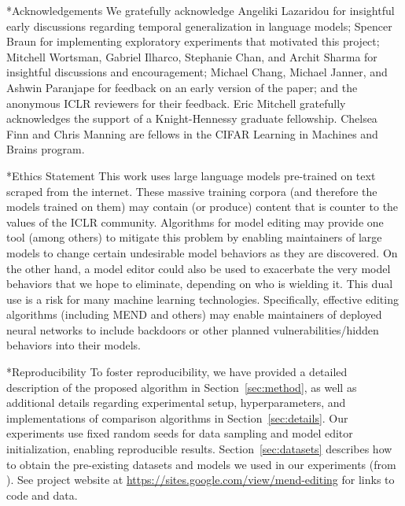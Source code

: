 \documentclass{article}
\makeatletter
\newcommand{\name}{MEND}
\newcommand{\rebuttal}[1]{#1}
\newcommand{\cameraready}[1]{#1}
\let\origsection\section
\renewcommand\section{\@ifstar{\starsection}{\nostarsection}}
\newcommand\nostarsection[1]
{\sectionprelude\origsection{#1}\sectionpostlude}
\newcommand\starsection[1]
{\sectionprelude\origsection*{#1}\sectionpostlude}
\newcommand\sectionprelude{%
  \vspace{-1.5mm}
}
\newcommand\sectionpostlude{%
  \vspace{-2mm}
}
\makeatother
\begin{document}
\cameraready{\section*{Acknowledgements}
We gratefully acknowledge Angeliki Lazaridou for insightful early discussions regarding temporal generalization in language models; Spencer Braun for implementing exploratory experiments that motivated this project; Mitchell Wortsman, Gabriel Ilharco, Stephanie Chan, and Archit Sharma for insightful discussions and encouragement; Michael Chang, Michael Janner, and Ashwin Paranjape for feedback on an early version of the paper; and the anonymous ICLR reviewers for their feedback. Eric Mitchell gratefully acknowledges the support of a Knight-Hennessy graduate fellowship. Chelsea Finn and Chris Manning are fellows in the CIFAR Learning in Machines and Brains program.}

\section*{Ethics Statement}
This work uses large language models pre-trained on text scraped from the internet. These massive training corpora (and therefore the models trained on them) may contain (or produce) content that is counter to the values of the ICLR community. Algorithms for model editing may provide one tool (among others) to mitigate this problem by enabling maintainers of large models to change certain undesirable model behaviors as they are discovered. On the other hand, a model editor could also be used to exacerbate the very model behaviors that we hope to eliminate, depending on who is wielding it. This dual use is a risk for many machine learning technologies. \rebuttal{Specifically, effective editing algorithms (including {\name} and others) may enable maintainers of deployed neural networks to include backdoors or other planned vulnerabilities/hidden behaviors into their models.}

\section*{Reproducibility}
To foster reproducibility, we have provided a detailed description of the proposed algorithm in Section~\ref{sec:method}, as well as additional details regarding experimental setup, hyperparameters, and implementations of comparison algorithms in Section~\ref{sec:details}. Our experiments use fixed random seeds for data sampling and model editor initialization, enabling reproducible results. Section~\ref{sec:datasets} describes how to obtain the pre-existing datasets and models we used in our experiments (from \cite{Cao2021EditingFK}). See project website at \href{https://sites.google.com/view/mend-editing}{https://sites.google.com/view/mend-editing} for links to code and data.
\end{document}
